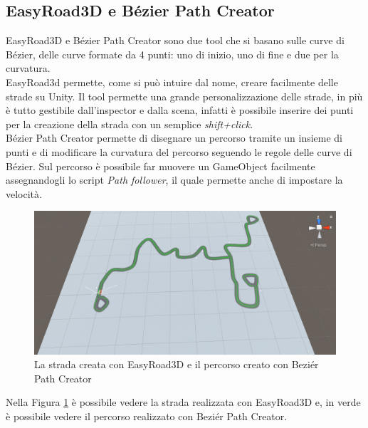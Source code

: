 \documentclass[12pt, openany]{book}
\begin{document}
	\subsection{EasyRoad3D e Bézier Path Creator}
	EasyRoad3D \cite{EasyRoad3D} e Bézier Path Creator \cite{Bezier}
	sono due tool che si basano sulle curve di Bézier, delle curve formate da 4 punti: uno di inizio, uno di fine e due per la curvatura. \\
	EasyRoad3d permette, come si può intuire dal nome, creare facilmente delle strade su Unity. Il tool permette una grande personalizzazione delle strade, in più è tutto gestibile dall'inspector e dalla scena, infatti è possibile inserire dei punti per la creazione della strada con un semplice \emph{shift+click}.\\
	Bézier Path Creator permette di disegnare un percorso tramite un insieme di punti e di modificare la curvatura del percorso seguendo le regole delle curve di Bézier. Sul percorso è possibile far muovere un GameObject facilmente assegnandogli lo script \emph{Path follower}, il quale permette anche di impostare la velocità.
		\begin{figure}[H]
		\centering
		\includegraphics[width=1\linewidth]{"Immagini/EasyRoad+Bezier.png"}
		\caption{La strada creata con EasyRoad3D e il percorso creato con Beziér Path Creator}
		\label{fig:E+B}
	\end{figure}
	Nella Figura \ref{fig:E+B} è possibile vedere la strada realizzata con EasyRoad3D e, in verde è possibile vedere il percorso realizzato con Beziér Path Creator.
	
\end{document}
